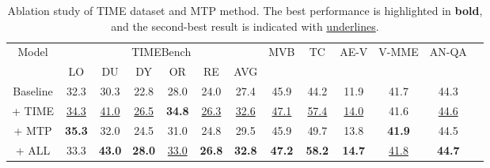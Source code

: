 





\begin{table}[t]
\centering


\begin{tabular}{ccccccccccccc}
\toprule
\multirow{2}{*}{Model} & \multicolumn{6}{c}{TIMEBench} & \multirow{2}{*}{MVB}  & \multirow{2}{*}{TC} & \multirow{2}{*}{AE-V} & \multirow{2}{*}{V-MME} & \multirow{2}{*}{AN-QA} \\
\cmidrule(lr){2-7}
 & LO & DU & DY & OR & RE & AVG & & \\
\midrule
Baseline  & 32.3 & 30.3 & 22.8 & 28.0 & 24.0 & 27.4 & 45.9 & 44.2 & 11.9 & 41.7 & 44.3 \\

+ TIME    & \underline{34.3} & \underline{41.0} & \underline{26.5} & \textbf{34.8} & \underline{26.3} & \underline{32.6} & \underline{47.1} & \underline{57.4} & \underline{14.0} & 41.6 & \underline{44.6} \\ 

+ MTP     & \textbf{35.3} & 32.0 & 24.5 & 31.0 & 24.8 & 29.5 & 45.9 & 49.7 & 13.8 & \textbf{41.9} & 44.5 \\

+ ALL     & 33.3 & \textbf{43.0} & \textbf{28.0} & \underline{33.0} & \textbf{26.8} & \textbf{32.8} & \textbf{47.2} & \textbf{58.2} & \textbf{14.7} & \underline{41.8} & \textbf{44.7} \\ 
\bottomrule
\end{tabular}

\caption{Ablation study of TIME dataset and MTP method. The best performance is highlighted in \textbf{bold}, and the second-best result is indicated with \underline{underlines}.}
\label{tab:ablation}
\end{table}
